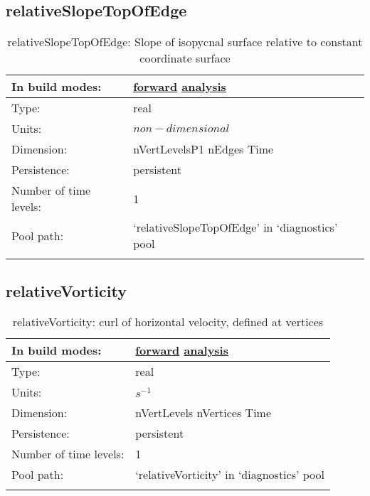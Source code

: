 \subsection[relativeSlopeTopOfEdge]{relativeSlopeTopOfEdge}
\label{subsec:var_sec_diagnostics_relativeSlopeTopOfEdge}
\begin{center}
\begin{longtable}{| p{2.0in} | p{4.0in} |}
        \hline 
        In build modes: & \hyperref[subsec:forward_var_tab_diagnostics]{forward} \hyperref[subsec:analysis_var_tab_diagnostics]{analysis} \\
        \hline 
        Type: & real \\
        \hline 
        Units: & $non-dimensional$ \\
        \hline 
        Dimension: & nVertLevelsP1 nEdges Time \\
        \hline 
        Persistence: & persistent \\
        \hline 
        Number of time levels: & 1 \\
        \hline 
            Pool path: & `relativeSlopeTopOfEdge' in `diagnostics' pool \\
		 \hline 
    \caption{relativeSlopeTopOfEdge: Slope of isopycnal surface relative to constant coordinate surface}
\end{longtable}
\end{center}
\subsection[relativeVorticity]{relativeVorticity}
\label{subsec:var_sec_diagnostics_relativeVorticity}
\begin{center}
\begin{longtable}{| p{2.0in} | p{4.0in} |}
        \hline 
        In build modes: & \hyperref[subsec:forward_var_tab_diagnostics]{forward} \hyperref[subsec:analysis_var_tab_diagnostics]{analysis} \\
        \hline 
        Type: & real \\
        \hline 
        Units: & $s^{-1}$ \\
        \hline 
        Dimension: & nVertLevels nVertices Time \\
        \hline 
        Persistence: & persistent \\
        \hline 
        Number of time levels: & 1 \\
        \hline 
            Pool path: & `relativeVorticity' in `diagnostics' pool \\
		 \hline 
    \caption{relativeVorticity: curl of horizontal velocity, defined at vertices}
\end{longtable}
\end{center}
